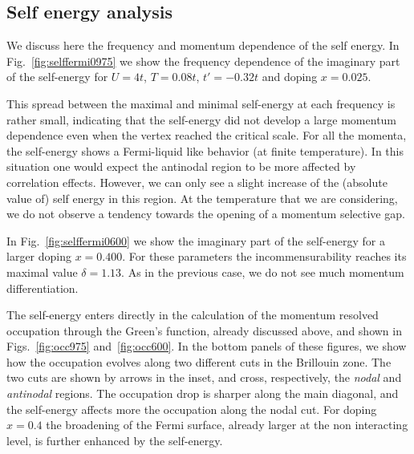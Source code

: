 \subsection{Self energy analysis}
We discuss here the frequency and momentum dependence of the self energy. 
In Fig.~\ref{fig:selffermi0975}  we show the frequency dependence of the imaginary part of the self-energy for $U=4t$, $T=0.08t$,  $t'=-0.32t$ and doping $x=0.025$. 

This spread between the maximal and minimal self-energy at each frequency is rather small, indicating that the self-energy did not develop a large momentum dependence even when the vertex reached the critical scale. 
For all the momenta, the self-energy shows a Fermi-liquid like behavior (at finite temperature). 
In this situation one would expect the antinodal region to be more affected by correlation effects. 
However, we can only see a slight increase of the (absolute value of) self energy in this region. 
At the temperature that we are considering, we do not observe a tendency towards the opening of a momentum selective gap. 

In Fig.~\ref{fig:selffermi0600} we show the imaginary part of the self-energy for a larger doping $x=0.400$. For these parameters the incommensurability reaches its maximal value  $\delta=1.13$. 
As in the previous case, we do not see much momentum differentiation.

The self-energy enters directly in the calculation of the momentum resolved occupation through the Green's function, already discussed above, and shown in  Figs.~\ref{fig:occ975} and~\ref{fig:occ600}.
In the bottom panels of these figures,  we show how the occupation evolves along two different cuts in the Brillouin zone.
The two cuts are shown by arrows in the inset, and cross, respectively,  the \textit{nodal} and \textit{antinodal} regions.
The occupation drop is sharper along the main diagonal, and the self-energy affects more the occupation along the nodal cut.
For doping $x=0.4$ the broadening of the Fermi surface, already larger at the non interacting level, is further enhanced by the self-energy.

